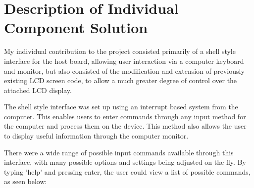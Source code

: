 \section{Description of Individual Component Solution}

My individual contribution to the project consisted primarily of a shell style 
interface for the host board, allowing user interaction via a computer keyboard 
and monitor, but also consisted of the modification and extension of previously 
existing LCD screen code, to allow a much greater degree of control over the 
attached LCD display. 
\par\bigskip\noindent
The shell style interface was set up using an interrupt based system from the 
computer. This enables users to enter commands through any input method for 
the computer and process them on the device. This method also allows the user
to display useful information through the computer monitor.
\par\bigskip\noindent
There were a wide range of possible input commands available through this 
interface, with many possible options and settings being adjusted on the fly. 
By typing 'help' and pressing enter, the user could view a list of possible 
commands, as seen below: 

